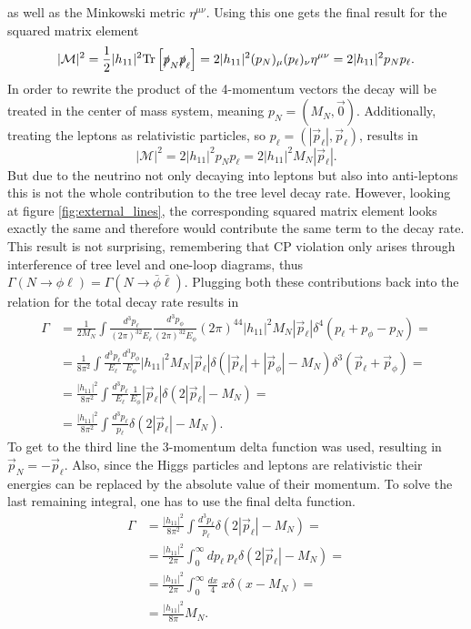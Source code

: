 as well as the Minkowski metric $\eta^{\mu\nu}$. Using this one gets the final result for the squared matrix element
\begin{equation*}
	|\mathcal{M}|^2=\frac{1}{2}|h_{11}|^2\text{Tr}\left[\slashed p_N \slashed p_\ell\right]=2|h_{11}|^2(p_N)_\mu (p_\ell)_\nu\eta^{\mu\nu}=2|h_{11}|^2p_Np_\ell.
\end{equation*}
In order to rewrite the product of the 4-momentum vectors the decay will be treated in the center of mass system, meaning $p_N=(M_N,\vec{0})$. Additionally, treating the leptons as relativistic particles, so $p_\ell=(|\vec{p}_\ell|,\vec{p}_\ell)$, results in
\begin{equation*}
|\mathcal{M}|^2=2|h_{11}|^2p_Np_\ell=2|h_{11}|^2M_N|\vec{p}_\ell|.
\end{equation*}
But due to the neutrino not only decaying into leptons but also into anti-leptons this is not the whole contribution to the tree level decay rate. However, looking at figure \ref{fig:external_lines}, the corresponding squared matrix element looks exactly the same and therefore would contribute the same term to the decay rate. This result is not surprising, remembering that CP violation only arises through interference of tree level and one-loop diagrams, thus $\Gamma(N\rightarrow\phi\ell)=\Gamma(N\rightarrow\bar{\phi}\bar{\ell})$. Plugging both these contributions back into the relation for the total decay rate results in 
\begin{align*}
	\Gamma&=\frac{1}{2M_N}\int\frac{d^3p_\ell}{(2\pi)^32E_\ell}\frac{d^3p_\phi}{(2\pi)^32E_\phi}(2\pi)^44|h_{11}|^2M_N|\vec{p}_\ell|\delta^4\left(p_\ell+p_\phi-p_N\right)=\\
	&=\frac{1}{8\pi^2}\int\frac{d^3p_\ell}{E_\ell}\frac{d^3p_\phi}{E_\phi}|h_{11}|^2M_N|\vec{p}_\ell|\delta\left(|\vec{p}_\ell|+|\vec{p}_\phi|-M_N\right)\delta^3\left(\vec{p}_\ell+\vec{p}_\phi\right)=\\
	&=\frac{|h_{11}|^2}{8\pi^2}\int\frac{d^3p_\ell}{E_\ell}\frac{1}{E_\phi}|\vec{p}_\ell|\delta\left(2|\vec{p}_\ell|-M_N\right)=\\
	&=\frac{|h_{11}|^2}{8\pi^2}\int\frac{d^3p_\ell}{p_\ell}\delta\left(2|\vec{p}_\ell|-M_N\right).
\end{align*}
To get to the third line the 3-momentum delta function was used, resulting in $\vec{p}_N=-\vec{p}_\ell$. Also, since the Higgs particles and leptons are relativistic their energies can be replaced by the absolute value of their momentum. To solve the last remaining integral, one has to use the final delta function.
\begin{align*}
	\Gamma&=\frac{|h_{11}|^2}{8\pi^2}\int\frac{d^3p_\ell}{p_\ell}\delta\left(2|\vec{p}_\ell|-M_N\right)=\\
	&=\frac{|h_{11}|^2}{2\pi}\int_0^{\infty} dp_\ell \:p_\ell\delta\left(2|\vec{p}_\ell|-M_N\right)=\\
	&=\frac{|h_{11}|^2}{2\pi}\int_0^{\infty} \frac{dx}{4}\:x\delta\left(x-M_N\right)=\\
	&=\frac{|h_{11}|^2}{8\pi}M_N.
\end{align*}
